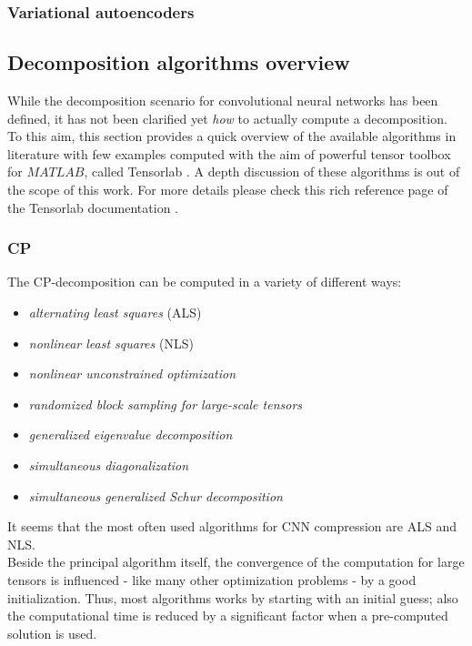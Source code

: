 \subsubsection{Variational autoencoders}


\subsection{Decomposition algorithms overview}
While the decomposition scenario for convolutional neural networks has been defined, it has not been clarified yet \emph{how} to actually compute a decomposition. To this aim, this section provides a quick overview of the available algorithms in literature with few examples computed with the aim of powerful tensor toolbox for $MATLAB$, called Tensorlab \parencite{WTensorlab}. \newline
A depth discussion of these algorithms is out of the scope of this work. For more details please check this rich reference page of the Tensorlab documentation \parencite{WTensorlab-ref}.

\subsubsection{CP}
The CP-decomposition can be computed in a variety of different ways: 
    \begin{itemize}
        \item \emph{alternating least squares} (ALS)
        \item \emph{nonlinear least squares} (NLS)
        \item \emph{nonlinear unconstrained optimization}
        \item \emph{randomized block sampling for large-scale tensors}
        \item \emph{generalized eigenvalue decomposition}
        \item \emph{simultaneous diagonalization}
        \item \emph{simultaneous generalized Schur decomposition}
\end{itemize}
It seems that the most often used algorithms for CNN compression are ALS and NLS. \\
Beside the principal algorithm itself, the convergence of the computation for large tensors is influenced - like many other optimization problems - by a good initialization. Thus, most algorithms works by starting with an initial guess; also the computational time is reduced by a significant factor when a pre-computed solution is used. 
\newline

